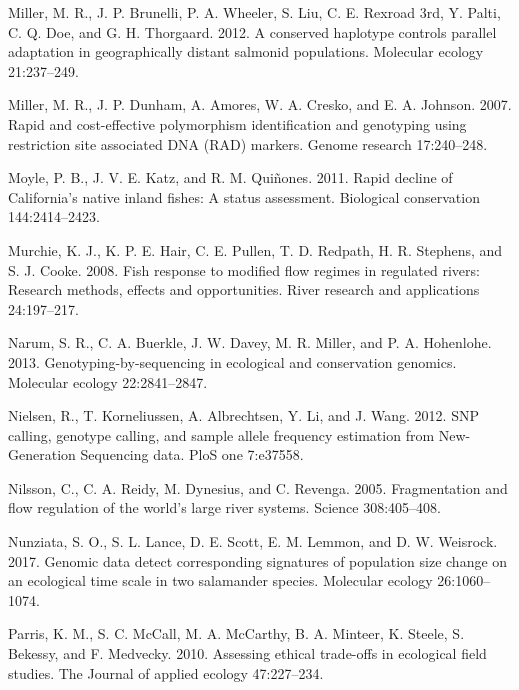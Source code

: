\documentclass[twoside,12pt,final]{ucthesis-CA2012} %
\begin{document}
\begin{ucmainmatter}
\leavevmode\hypertarget{ref-miller_conserved_2012}{}%
Miller, M. R., J. P. Brunelli, P. A. Wheeler, S. Liu, C. E. Rexroad 3rd,
Y. Palti, C. Q. Doe, and G. H. Thorgaard. 2012. A conserved haplotype
controls parallel adaptation in geographically distant salmonid
populations. Molecular ecology 21:237--249.

\leavevmode\hypertarget{ref-miller_rapid_2007}{}%
Miller, M. R., J. P. Dunham, A. Amores, W. A. Cresko, and E. A. Johnson.
2007. Rapid and cost-effective polymorphism identification and
genotyping using restriction site associated DNA (RAD) markers. Genome
research 17:240--248.

\leavevmode\hypertarget{ref-moyle_rapid_2011}{}%
Moyle, P. B., J. V. E. Katz, and R. M. Quiñones. 2011. Rapid decline of
California's native inland fishes: A status assessment. Biological
conservation 144:2414--2423.

\leavevmode\hypertarget{ref-murchie_fish_2008}{}%
Murchie, K. J., K. P. E. Hair, C. E. Pullen, T. D. Redpath, H. R.
Stephens, and S. J. Cooke. 2008. Fish response to modified flow regimes
in regulated rivers: Research methods, effects and opportunities. River
research and applications 24:197--217.

\leavevmode\hypertarget{ref-narum_genotyping-by-sequencing_2013}{}%
Narum, S. R., C. A. Buerkle, J. W. Davey, M. R. Miller, and P. A.
Hohenlohe. 2013. Genotyping-by-sequencing in ecological and conservation
genomics. Molecular ecology 22:2841--2847.

\leavevmode\hypertarget{ref-nielsen_snp_2012}{}%
Nielsen, R., T. Korneliussen, A. Albrechtsen, Y. Li, and J. Wang. 2012.
SNP calling, genotype calling, and sample allele frequency estimation
from New-Generation Sequencing data. PloS one 7:e37558.

\leavevmode\hypertarget{ref-nilsson_fragmentation_2005}{}%
Nilsson, C., C. A. Reidy, M. Dynesius, and C. Revenga. 2005.
Fragmentation and flow regulation of the world's large river systems.
Science 308:405--408.

\leavevmode\hypertarget{ref-nunziata_genomic_2017}{}%
Nunziata, S. O., S. L. Lance, D. E. Scott, E. M. Lemmon, and D. W.
Weisrock. 2017. Genomic data detect corresponding signatures of
population size change on an ecological time scale in two salamander
species. Molecular ecology 26:1060--1074.

\leavevmode\hypertarget{ref-parris_assessing_2010}{}%
Parris, K. M., S. C. McCall, M. A. McCarthy, B. A. Minteer, K. Steele,
S. Bekessy, and F. Medvecky. 2010. Assessing ethical trade-offs in
ecological field studies. The Journal of applied ecology 47:227--234.


\end{ucmainmatter}
\end{document}
